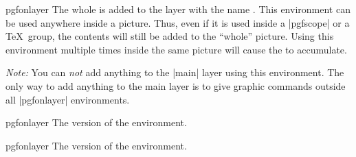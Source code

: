 \begin{environment}{{pgfonlayer}}
    The whole  is added to the layer with the name
    . This environment can be used anywhere inside a picture.
    Thus, even if it is used inside a |{pgfscope}| or a \TeX\ group, the
    contents will still be added to the ``whole'' picture. Using this
    environment multiple times inside the same picture will cause the
     to accumulate.

    \emph{Note:} You can \emph{not} add anything to the |main| layer using this
    environment. The only way to add anything to the main layer is to give
    graphic commands outside all |{pgfonlayer}| environments.
\begin{codeexample}[]
\end{codeexample}
\end{environment}

\begin{plainenvironment}{{pgfonlayer}}
    The  version of the environment.
\end{plainenvironment}

\begin{contextenvironment}{{pgfonlayer}}
    The  version of the environment.
\end{contextenvironment}


